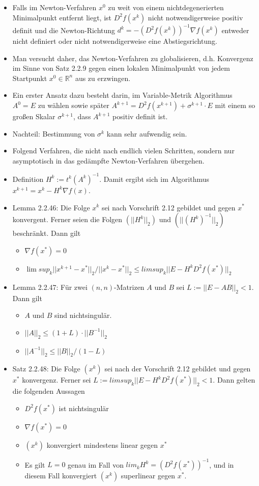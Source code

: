 \documentclass[paper=a4, fontsize=11pt]{scrartcl} %
\numberwithin{equation}{section} %
\numberwithin{figure}{section} %
\numberwithin{table}{section} %
\begin{document}
\begin{itemize}
  \item Falls im Newton-Verfahren $x^0$ zu weit von einem nichtdegenerierten Minimalpunkt entfernt liegt, ist $D^2 f(x^k)$ nicht notwendigerweise positiv definit und die Newton-Richtung $d^k = -(D^2 f(x^k))^{-1} \nabla f(x^k)$ entweder nicht definiert oder nicht notwendigerweise eine Abstiegsrichtung.
  \item Man versucht daher, das Newton-Verfahren zu globalisieren, d.h. Konvergenz im Sinne von Satz 2.2.9 gegen einen lokalen Minimalpunkt von jedem Startpunkt $x^0 \in \mathbb{R}^n$ aus zu erzwingen.
  \item Ein erster Ansatz dazu besteht darin, im Variable-Metrik Algorithmus $A^0 = E$ zu wählen sowie später $A^{k+1} = D^2 f(x^{k+1}) + \sigma^{k+1} \cdot E$ mit einem so großen Skalar $\sigma^{k+1}$, dass $A^{k+1}$ positiv definit ist.
  \item Nachteil: Bestimmung von $\sigma^k$ kann sehr aufwendig sein.
  \item Folgend Verfahren, die nicht nach endlich vielen Schritten, sondern nur asymptotisch in das gedämpfte Newton-Verfahren übergehen.
  \item Definition $H^k := t^k(A^k)^{-1}$. Damit ergibt sich im Algorithmus $x^{k+1} = x^k - H^k \nabla f(x)$.
  \item Lemma 2.2.46: Die Folge $x^k$ sei nach Vorschrift 2.12 gebildet und gegen $x^*$ konvergent. Ferner seien die Folgen $(||H^k||_2)$ und $(||(H^k)^{-1}||_2)$ beschränkt. Dann gilt
  \begin{itemize}
    \item $\nabla f(x^*) = 0$
    \item $\lim sup_k ||x^{k+1} - x^* ||_2 / ||x^k - x^*||_2 \le lim sup_k ||E - H^k D^2 f(x^*)||_2$
  \end{itemize}
  \item Lemma 2.2.47: Für zwei $(n,n)$-Matrizen $A$ und $B$ sei $L := ||E-AB||_2 < 1$. Dann gilt
  \begin{itemize}
    \item $A$ und $B$ sind nichtsingulär.
    \item $||A||_2 \le (1+L) \cdot ||B^{-1}||_2$
    \item $||A^{-1}||_2 \le ||B||_2 / (1-L)$
  \end{itemize}
  \item Satz 2.2.48: Die Folge $(x^k)$ sei nach der Vorschrift 2.12 gebildet und gegen $x^*$ konvergenz. Ferner sei $L := lim sup_k ||E- H^k D^2 f(x^*)||_2 < 1$. Dann gelten die folgenden Aussagen
  \begin{itemize}
    \item $D^2f(x^*)$ ist nichtsingulär
    \item $\nabla f(x^*) = 0$
    \item $(x^k)$ konvergiert mindestens linear gegen $x^*$
    \item Es gilt $L = 0$ genau im Fall von $lim_k H^k = (D^2 f(x^*))^{-1}$, und in diesem Fall konvergiert $(x^k)$ superlinear gegen $x^*$.
  \end{itemize}
\end{itemize}
\end{document}
